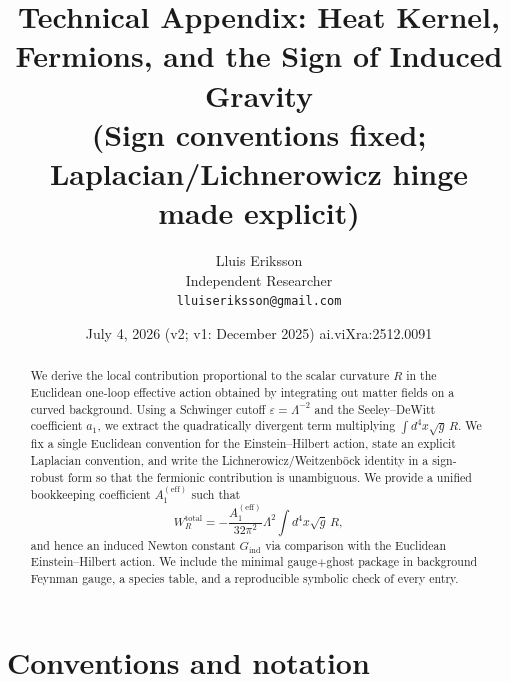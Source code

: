 \documentclass[11pt,a4paper]{article}
\title{Technical Appendix: Heat Kernel, Fermions, and the Sign of Induced
Gravity\\[2mm]
\large (Sign conventions fixed; Laplacian/Lichnerowicz hinge made explicit)}
\author{Lluis Eriksson\\ \small Independent Researcher\\
\small \texttt{lluiseriksson@gmail.com}}
\date{July 4, 2026 \quad (v2; v1: December 2025) \quad ai.viXra:2512.0091}
\newcommand{\Aeff}{A_1^{(\mathrm{eff})}}
\begin{document}
\maketitle

\begin{center}
\end{center}

\begin{abstract}
We derive the local contribution proportional to the scalar curvature $R$ in
the Euclidean one-loop effective action obtained by integrating out matter
fields on a curved background. Using a Schwinger cutoff $\varepsilon =
\Lambda^{-2}$ and the Seeley--DeWitt coefficient $a_1$, we extract the
quadratically divergent term multiplying $\int d^4x\sqrt{g}\,R$. We fix a
single Euclidean convention for the Einstein--Hilbert action, state an explicit
Laplacian convention, and write the Lichnerowicz/Weitzenb\"ock identity in a
sign-robust form so that the fermionic contribution is unambiguous. We provide
a unified bookkeeping coefficient $\Aeff$ such that
\[
W_R^{\mathrm{total}} = -\frac{\Aeff}{32\pi^2}\Lambda^2
\int d^4x\sqrt{g}\,R,
\]
and hence an induced Newton constant $G_{\mathrm{ind}}$ via comparison with the
Euclidean Einstein--Hilbert action. We include the minimal gauge${+}$ghost
package in background Feynman gauge, a species table, and a reproducible
symbolic check of every entry.
\end{abstract}

\section{Conventions and notation}
\end{document}
